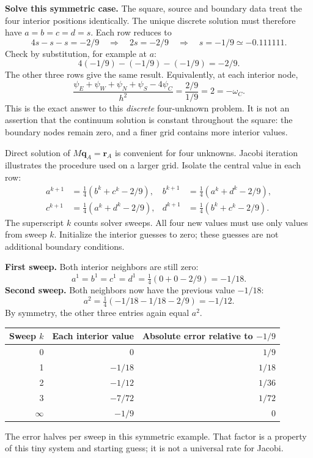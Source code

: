 \textbf{Solve this symmetric case.} The square, source and boundary data treat
the four interior positions identically. The unique discrete solution must
therefore have $a=b=c=d=s$. Each row reduces to
\[
4s-s-s=-2/9\quad\Longrightarrow\quad 2s=-2/9
\quad\Longrightarrow\quad \boxed{s=-1/9\simeq-0.111111.}
\]
Check by substitution, for example at $a$:
\[
4(-1/9)-(-1/9)-(-1/9)=-2/9.
\]
The other three rows give the same result. Equivalently, at each interior node,
\[
\frac{\psi_E+\psi_W+\psi_N+\psi_S-4\psi_C}{h^2}
=\frac{2/9}{1/9}=2=-\omega_C.
\]
This is the exact answer to this \emph{discrete} four-unknown problem. It is
not an assertion that the continuum solution is constant throughout the square:
the boundary nodes remain zero, and a finer grid contains more interior values.

\newpage
{}
Direct solution of $M\boldsymbol q_A=\boldsymbol r_A$ is convenient for four
unknowns. Jacobi iteration illustrates the procedure used on a larger grid.
Isolate the central value in each row:
\begin{align*}
a^{k+1}&=\tfrac14(b^k+c^k-2/9),&
b^{k+1}&=\tfrac14(a^k+d^k-2/9),\\
c^{k+1}&=\tfrac14(a^k+d^k-2/9),&
d^{k+1}&=\tfrac14(b^k+c^k-2/9).
\end{align*}
The superscript $k$ counts solver sweeps. All four new values must use only
values from sweep $k$. Initialize the interior guesses to zero; these guesses
are not additional boundary conditions.

\textbf{First sweep.} Both interior neighbors are still zero:
\[
a^1=b^1=c^1=d^1=\tfrac14(0+0-2/9)=-1/18.
\]
\textbf{Second sweep.} Both neighbors now have the previous value $-1/18$:
\[
a^2=\tfrac14(-1/18-1/18-2/9)=-1/12.
\]
By symmetry, the other three entries again equal $a^2$.
\begin{center}\begin{tabular}{rrr}\toprule
Sweep $k$ & Each interior value & Absolute error relative to $-1/9$\\\midrule
0 & $0$ & $1/9$\\
1 & $-1/18$ & $1/18$\\
2 & $-1/12$ & $1/36$\\
3 & $-7/72$ & $1/72$\\
$\infty$ & $-1/9$ & $0$\\\bottomrule
\end{tabular}\end{center}
The error halves per sweep in this symmetric example. That factor is a property
of this tiny system and starting guess; it is not a universal rate for Jacobi.

